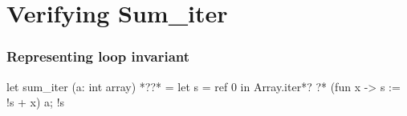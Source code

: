 \documentclass[xcolor=dvipsnames]{beamer}
\begin{document}
\section*{Verifying Sum_iter}
\begin{frame}[fragile]
\frametitle{Representing loop invariant}
\begin{whycode}
 let sum_iter (a: int array) *??* 
 = let s = ref 0 in
   Array.iter*?
   ?* 
       (fun x ->  s := !s + x) a; 
   !s 
\end{whycode}
\end{frame}

%
\end{document}
